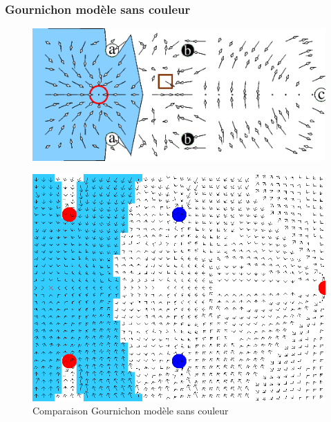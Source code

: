 \documentclass{beamer}
\begin{document}
\begin{frame}
  \frametitle{Gournichon modèle sans couleur}
  \begin{figure}
    \centering
    \includegraphics[scale=0.3]{nocolor_article.png}
  \end{figure}
  \begin{figure}
    \centering
    \includegraphics[scale=0.15]{nocolor_res.png}
    \caption{Comparaison Gournichon modèle sans couleur}
  \end{figure}  
\end{frame}
\end{document}
